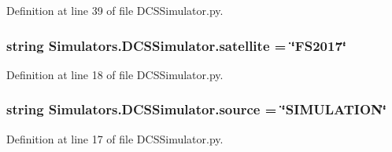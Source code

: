 Definition at line 39 of file D\+C\+S\+Simulator.\+py.

\hypertarget{namespace_simulators_1_1_d_c_s_simulator_ada42061815ff9cd364d8d014292b500f}{}
\subsubsection[{satellite}]{\setlength{\rightskip}{0pt plus 5cm}string Simulators.\+D\+C\+S\+Simulator.\+satellite = \char`\"{}F\+S2017\char`\"{}}\label{namespace_simulators_1_1_d_c_s_simulator_ada42061815ff9cd364d8d014292b500f}


Definition at line 18 of file D\+C\+S\+Simulator.\+py.

\hypertarget{namespace_simulators_1_1_d_c_s_simulator_a12e10df9b349db60ce82354e3132066f}{}
\subsubsection[{source}]{\setlength{\rightskip}{0pt plus 5cm}string Simulators.\+D\+C\+S\+Simulator.\+source = \char`\"{}S\+I\+M\+U\+L\+A\+T\+I\+O\+N\char`\"{}}\label{namespace_simulators_1_1_d_c_s_simulator_a12e10df9b349db60ce82354e3132066f}


Definition at line 17 of file D\+C\+S\+Simulator.\+py.

